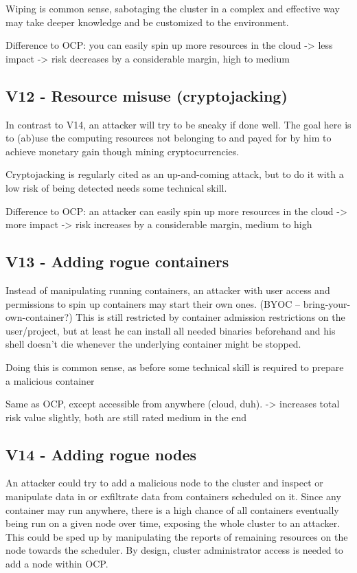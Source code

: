 Wiping is common sense, sabotaging the cluster in a complex and effective way may take deeper knowledge and be customized to the environment.

Difference to OCP: you can easily spin up more resources in the cloud -> less impact
-> risk decreases by a considerable margin, high to medium

\subsection{V12 - Resource misuse (cryptojacking)}
In contrast to V14, an attacker will try to be sneaky if done well.
The goal here is to (ab)use the computing resources not belonging to and payed for by him to achieve monetary gain though mining cryptocurrencies.

Cryptojacking is regularly cited as an up-and-coming attack, but to do it with a low risk of being detected needs some technical skill.

Difference to OCP: an attacker can easily spin up more resources in the cloud -> more impact
-> risk increases by a considerable margin, medium to high

\subsection{V13 - Adding rogue containers}
Instead of manipulating running containers, an attacker with user access and permissions to spin up containers may start their own ones. (BYOC – bring-your-own-container?)
This is still restricted by container admission restrictions on the user/project, but at least he can install all needed binaries beforehand and his shell doesn’t die whenever the underlying container might be stopped.

Doing this is common sense, as before some technical skill is required to prepare a malicious container

Same as OCP, except accessible from anywhere (cloud, duh).
-> increases total risk value slightly, both are still rated medium in the end

\subsection{V14 - Adding rogue nodes}
An attacker could try to add a malicious node to the cluster and inspect or manipulate data in or exfiltrate data from containers scheduled on it. Since any container may run anywhere, there is a high chance of all containers eventually being run on a given node over time, exposing the whole cluster to an attacker. This could be sped up by manipulating the reports of remaining resources on the node towards the scheduler.
By design, cluster administrator access is needed to add a node within OCP.

